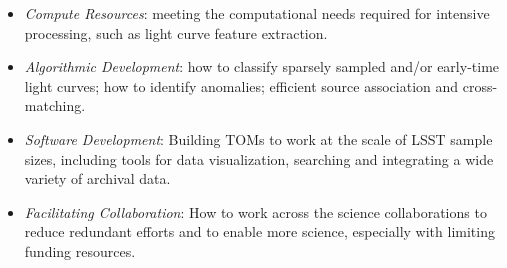 \medskip
{}
\begin{itemize}
\item {\it Compute Resources}: meeting the computational needs required for intensive processing, such as light curve feature extraction.
\item {\it Algorithmic Development}: how to classify sparsely sampled and/or early-time light curves; how to identify anomalies; efficient source association and cross-matching.
\item {\it Software Development}: Building TOMs to work at the scale of LSST sample sizes, including tools for data visualization, searching and integrating a wide variety of archival data.
\item {\it Facilitating Collaboration}: How to work across the science collaborations to reduce redundant efforts and to enable more science, especially with limiting funding resources.
\end{itemize}



